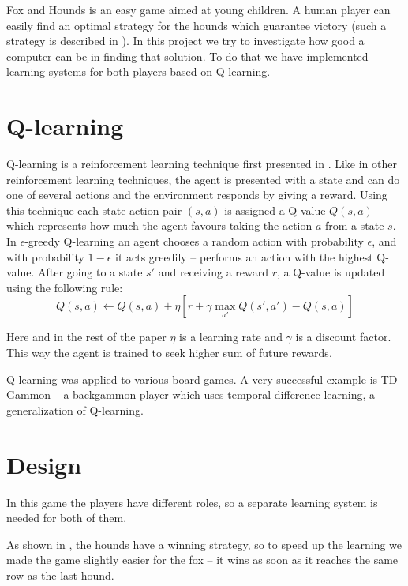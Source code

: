 \documentclass[a4paper]{article}
\begin{document}
Fox and Hounds is an easy game aimed at young children. A human player can
easily find an optimal strategy for the hounds which guarantee victory (such a
strategy is described in \cite{berlekamp82}). In this project we try to
investigate how good a computer can be in finding that solution. To do that we
have implemented learning systems for both players based on Q-learning.

\section{Q-learning}
Q-learning is a reinforcement learning technique first presented in
\cite{watkins89}. Like in other reinforcement learning techniques, the agent is
presented with a state and can do one of several actions and the environment
responds by giving a reward. Using this technique each state-action pair $(s,
a)$ is assigned a Q-value $Q(s, a)$ which represents how much the agent favours
taking the action $a$ from a state $s$. In $\epsilon$-greedy Q-learning an agent
chooses a random action with probability $\epsilon$, and with probability $1 -
\epsilon$ it acts greedily -- performs an action with the highest Q-value.
After going to a state $s\prime$ and receiving a reward $r$, a Q-value is
updated using the following rule:
\[
    Q(s, a) \gets Q(s, a) + \eta [r + \gamma \max_{a\prime} Q(s\prime, a\prime)
    - Q(s, a)]
\]

Here and in the rest of the paper $\eta$ is a learning rate and $\gamma$ is a
discount factor. This way the agent is trained to seek higher sum of future
rewards.

Q-learning was applied to various board games. A very successful example is
TD\mbox{-}Gammon \cite{gerald95} -- a backgammon player which uses
temporal-difference learning, a generalization of Q-learning.

\section{Design}
In this game the players have different roles, so a separate learning system is
needed for both of them.

As shown in \cite{berlekamp82}, the hounds have a winning strategy, so to speed
up the learning we made the game slightly easier for the fox -- it wins as soon
as it reaches the same row as the last hound.
\end{document}
